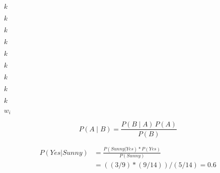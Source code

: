 \documentclass[10pt]{book}
\begin{document}
\begin{mdSnippets}
\begin{mdInlineSnippet}[8ce4b16b22b58894aa86c421e8759df3]%
$k$\end{mdInlineSnippet}%
\begin{mdInlineSnippet}[8ce4b16b22b58894aa86c421e8759df3]%
$k$\end{mdInlineSnippet}%
\begin{mdInlineSnippet}[8ce4b16b22b58894aa86c421e8759df3]%
$k$\end{mdInlineSnippet}%
\begin{mdInlineSnippet}[8ce4b16b22b58894aa86c421e8759df3]%
$k$\end{mdInlineSnippet}%
\begin{mdInlineSnippet}[8ce4b16b22b58894aa86c421e8759df3]%
$k$\end{mdInlineSnippet}%
\begin{mdInlineSnippet}[8ce4b16b22b58894aa86c421e8759df3]%
$k$\end{mdInlineSnippet}%
\begin{mdInlineSnippet}[8ce4b16b22b58894aa86c421e8759df3]%
$k$\end{mdInlineSnippet}%
\begin{mdInlineSnippet}[8ce4b16b22b58894aa86c421e8759df3]%
$k$\end{mdInlineSnippet}%
\begin{mdInlineSnippet}[8ce4b16b22b58894aa86c421e8759df3]%
$k$\end{mdInlineSnippet}%
\begin{mdInlineSnippet}[aa38f107289d4d73d516190581397349]%
$w_i$\end{mdInlineSnippet}%
\begin{mdDisplaySnippet}[ca75d1ef3213e1f65f51a3cefe6be37c]%
\[%
P(A \mid B) = \frac{P(B \mid A) \, P(A)}{P(B)}
\]%
\end{mdDisplaySnippet}%
\begin{mdDisplaySnippet}%
\[%
\begin{aligned}
P(Yes | Sunny) &= \frac{P (Sunny | Yes) * P (Yes) }{P(Sunny)}\\
&= ((3/9) * (9/14))/(5/14) = 0.6\\

\end{aligned}\]
\end{mdDisplaySnippet}
\end{mdSnippets}
\end{document}
